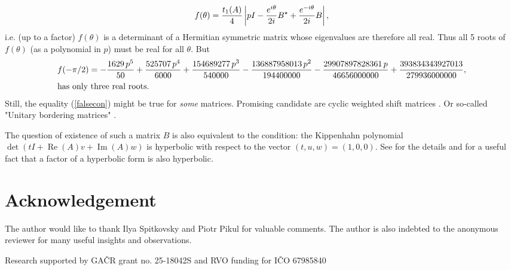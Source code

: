 \documentclass[10pt,a4paper,reqno]{amsart}
\newcommand{\zav}[1]{\left( #1 \right)}
\newcommand{\imag}{{\rm i}}
\renewcommand\Re{\operatorname{Re}}
\renewcommand\Im{\operatorname{Im}}
\newcommand{\deter}[1]{\det\zav{#1}}
\begin{document}
$$
f(\theta)=\frac{t_1(A)}{4}\left|pI-\frac{e^{\imag \theta}}{2\imag}B^\star+\frac{e^{-\imag \theta}}{2\imag}B\right|,
$$ 
i.e. (up to a factor) $f(\theta)$ is a determinant of a Hermitian symmetric matrix whose eigenvalues are therefore all real. Thus all 5 roots of $f(\theta)$ (as a polynomial in $p$) must be real for all $\theta$.
But
\begin{align*}
f(-\pi/2)&=-{\frac {1629\,{p}^{5}}{50}}+{\frac {525707\,{p}^{4}}{6000}}+{\frac {
154689277\,{p}^{3}}{540000}}-{\frac {136887958013\,{p}^{2}}{194400000}
}-{\frac {29907897828361\,p}{46656000000}}+{\frac {393834343927013}{
279936000000}},\\
\intertext{has only three real roots.} 
\end{align*}
Still, the equality (\ref{falsecon}) might be true for \textit{some} matrices. Promising candidate are cyclic weighted shift matrices \cite{cyclicpaper1}. Or so-called "Unitary bordering matrices" \cite{UBM1,UBM2,UBM3}.

The question of existence of such a matrix $B$ is also equivalent to the condition: the Kippenhahn
polynomial $\deter{tI+\Re(A)v+\Im(A)w}$ is hyperbolic with respect to the vector $(t,u,w)=(1, 0, 0)$. See \cite{hyperbolicpaper} for the details and \cite[page 130]{hyperbolicpaper2} for a useful fact that a factor of a hyperbolic form is also hyperbolic. 



\section{Acknowledgement}
The author would like to thank Ilya Spitkovsky and Piotr Pikul for valuable comments. The author is also indebted to the anonymous reviewer for many useful insights and observations.

Research supported by GA\v{C}R grant no. 25-18042S and RVO funding for I\v{C}O 67985840
\end{document}
